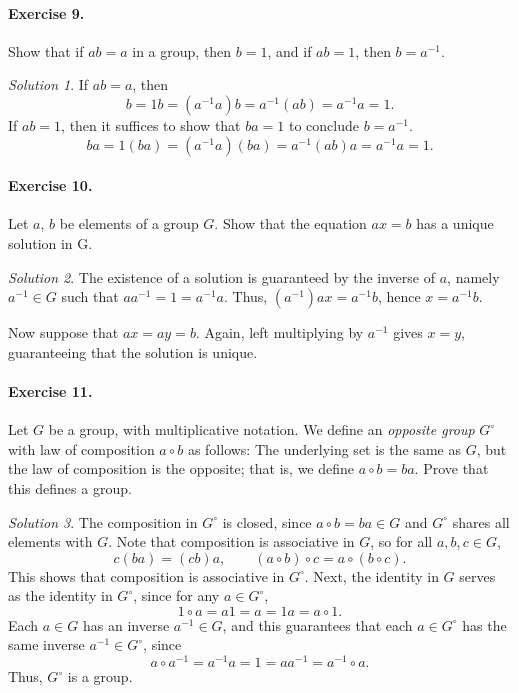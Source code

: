 \documentclass[11pt]{report}
\theoremstyle{remark}
\newtheorem*{solution}{Solution}
\begin{document}
    \paragraph{Exercise 9.} Show that if $ab = a$ in a group, then $b = 1$, and if
    $ab = 1$, then $b = a^{-1}$.
    \begin{solution}
        If $ab = a$, then \[
           b = 1b = (a^{-1}a)b = a^{-1}(ab) = a^{-1}a = 1. 
        \] If $ab = 1$, then it suffices to show that $ba = 1$ to conclude $b =
        a^{-1}$. \[
           ba = 1(ba) = (a^{-1}a)(ba) = a^{-1}(ab)a = a^{-1}a = 1.
        \] 
    \end{solution}

    \paragraph{Exercise 10.} Let $a$, $b$ be elements of a group $G$. Show that the
    equation $ax = b$ has a unique solution in G.
    \begin{solution}
        The existence of a solution is guaranteed by the inverse of $a$, namely
        $a^{-1} \in G$ such that $aa^{-1} = 1 = a^{-1}a$. Thus, $(a^{-1})ax =
        a^{-1}b$, hence $x = a^{-1}b$.

        Now suppose that $ax = ay = b$. Again, left multiplying by $a^{-1}$ gives $x
        = y$, guaranteeing that the solution is unique.
    \end{solution}
    
    \paragraph{Exercise 11.} Let $G$ be a group, with multiplicative notation. We
    define an \textit{opposite group} $G^\circ$ with law of composition $a \circ b$
    as follows: The underlying set is the same as $G$, but the law of composition is
    the opposite; that is, we define $a \circ b = ba$. Prove that this defines a group.
    \begin{solution}
        The composition in $G^\circ$ is closed, since $a\circ b = ba \in G$ and
        $G^\circ$ shares all elements with $G$. Note that composition is associative
        in $G$, so for all $a, b, c \in G$, \[
            c(ba) = (cb)a, \qquad (a\circ b) \circ c = a \circ (b\circ c).
        \] This shows that composition is associative in $G^\circ$. Next, the
        identity in $G$ serves as the identity in $G^\circ$, since for any $a \in
        G^\circ$, \[
            1\circ a = a1 = a = 1a = a\circ 1.
        \] Each $a \in G$ has an inverse $a^{-1} \in G$, and this guarantees that
        each $a \in G^\circ$ has the same inverse $a^{-1} \in G^\circ$, since \[
            a\circ a^{-1} = a^{-1}a = 1 = aa^{-1} = a^{-1}\circ a. 
        \] Thus, $G^\circ$ is a group.
    \end{solution}
\end{document}
